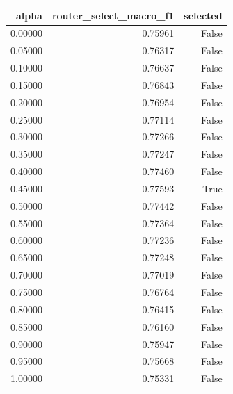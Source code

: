 \begin{tabular}{rrr}
\toprule
alpha & router\_select\_macro\_f1 & selected \\
\midrule
0.00000 & 0.75961 & False \\
0.05000 & 0.76317 & False \\
0.10000 & 0.76637 & False \\
0.15000 & 0.76843 & False \\
0.20000 & 0.76954 & False \\
0.25000 & 0.77114 & False \\
0.30000 & 0.77266 & False \\
0.35000 & 0.77247 & False \\
0.40000 & 0.77460 & False \\
0.45000 & 0.77593 & True \\
0.50000 & 0.77442 & False \\
0.55000 & 0.77364 & False \\
0.60000 & 0.77236 & False \\
0.65000 & 0.77248 & False \\
0.70000 & 0.77019 & False \\
0.75000 & 0.76764 & False \\
0.80000 & 0.76415 & False \\
0.85000 & 0.76160 & False \\
0.90000 & 0.75947 & False \\
0.95000 & 0.75668 & False \\
1.00000 & 0.75331 & False \\
\bottomrule
\end{tabular}

